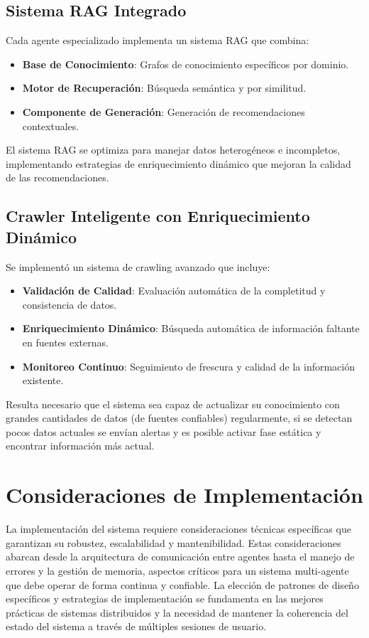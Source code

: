 \documentclass[runningheads,a4paper]{llncs}
\begin{document}
\subsection{Sistema RAG Integrado}

Cada agente especializado implementa un sistema RAG que combina:

\begin{itemize}
    \item \textbf{Base de Conocimiento}: Grafos de conocimiento específicos por dominio.
    \item \textbf{Motor de Recuperación}: Búsqueda semántica y por similitud.
    \item \textbf{Componente de Generación}: Generación de recomendaciones contextuales.
\end{itemize}

El sistema RAG se optimiza para manejar datos heterogéneos e incompletos, implementando estrategias de enriquecimiento 
dinámico que mejoran la calidad de las recomendaciones.

\subsection{Crawler Inteligente con Enriquecimiento Dinámico}

Se implementó un sistema de crawling avanzado que incluye:

\begin{itemize}
    \item \textbf{Validación de Calidad}: Evaluación automática de la completitud y consistencia de datos.
    \item \textbf{Enriquecimiento Dinámico}: Búsqueda automática de información faltante en fuentes externas.
    \item \textbf{Monitoreo Continuo}: Seguimiento de frescura y calidad de la información existente.
\end{itemize}

Resulta necesario que el sistema sea capaz de actualizar su conocimiento con grandes cantidades de datos (de fuentes 
confiables) regularmente, si se detectan pocos datos actuales se envían alertas y es posible activar fase estática y 
encontrar información más actual.

\section{Consideraciones de Implementación}

La implementación del sistema requiere consideraciones técnicas específicas que garantizan su robustez, escalabilidad 
y mantenibilidad. Estas consideraciones abarcan desde la arquitectura de comunicación entre agentes hasta el manejo de 
errores y la gestión de memoria, aspectos críticos para un sistema multi-agente que debe operar de forma continua y 
confiable. La elección de patrones de diseño específicos y estrategias de implementación se fundamenta en las mejores 
prácticas de sistemas distribuidos y la necesidad de mantener la coherencia del estado del sistema a través de múltiples 
sesiones de usuario.
\end{document}
